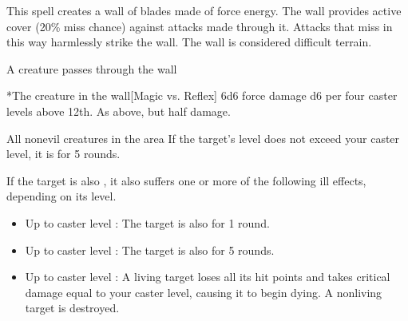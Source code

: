 \begin{spellheader}
    \spelldur{\durshort \dismissable}
\end{spellheader}
\begin{spelleffects}
    \spelleffect This spell creates a wall of blades made of force energy. The wall provides active cover (20\% miss chance) against attacks made through it. Attacks that miss in this way harmlessly strike the wall. The wall is considered difficult terrain.
    \begin{spelltrigger}{A creature passes through the wall}
        \begin{spelltarget}*{The creature in the wall}[Magic vs. Reflex]
            \spellsuccess 6d6 force damage \add d6 per four caster levels above 12th.
            \spellfailure As above, but half damage.
        \end{spelltarget}
    \end{spelltrigger}
\end{spelleffects}
\begin{spellfooter}
    
\end{spellfooter}

\begin{spellheader}
\end{spellheader}
\begin{spelleffects}
    \begin{spelltargets}{All nonevil creatures in the area}
        \spelleffect If the target's level does not exceed your caster level, it is \sickened for 5 rounds.

        If the target is also \bloodied, it also suffers one or more of the following ill effects, depending on its level.
        \begin{itemize}
            \item Up to caster level : The target is also \nauseated for 1 round.
            \item Up to caster level : The target is also \paralyzed for 5 rounds.
            \item Up to caster level : A living target loses all its hit points and takes critical damage equal to your caster level, causing it to begin dying. A nonliving target is destroyed.
        \end{itemize}
    \end{spelltargets}
\end{spelleffects}
\begin{spellfooter}
    
\end{spellfooter}

